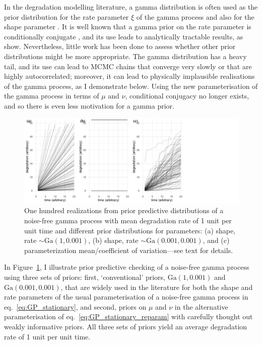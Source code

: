 In the degradation modelling literature, a gamma distribution is often used as the prior distribution for the rate parameter $\xi$ of the gamma process \citep{lawless2004} and also for the shape parameter \citep{rodriguez-picon2018}. It is well known that a gamma prior on the rate parameter is conditionally conjugate \citep{pradhan2011}, and its use leads to analytically tractable results, as \cite{lawless2004} show. Nevertheless, little work has been done to assess whether other prior distributions might be more appropriate. The gamma distribution has a heavy tail, and its use can lead to MCMC chains that converge very slowly or that are highly autocorrelated; moreover, it can lead to physically implausible realisations of the gamma process, as I demonstrate below. Using the new parameterisation of the gamma process in terms of $\mu$ and $\nu$, conditional conjugacy no longer exists, and so there is even less motivation for a gamma prior.

\begin{figure}
  \centering
  \includegraphics[width=1.2\textwidth]{./figures/ch-4/PPCs.pdf}
  \caption{One hundred realizations from prior predictive distributions of a noise-free gamma process with mean degradation rate of 1 unit per unit time and different prior distributions for parameters: (a) shape, rate $\sim \mbox{Ga}(1, 0.001)$, (b) shape, rate $\sim \mbox{Ga}(0.001, 0.001)$, and (c) parameterization mean/coefficient of variation---see text for details.}
  \label{fig:ppc}
\end{figure}

In Figure~\ref{fig:ppc}, I illustrate prior predictive checking of a noise-free gamma process using three sets of priors: first, `conventional' priors, $\mbox{Ga}(1, 0.001)$ and $\mbox{Ga}(0.001, 0.001)$, that are widely used in the literature for both the shape and rate parameters of the usual parameterisation of a noise-free gamma process in eq.~\eqref{eq:GP_stationary}, and second, priors on $\mu$ and $\nu$ in the alternative parameterisation of eq.~\eqref{eq:GP_stationary_reparam} with carefully thought out weakly informative priors. All three sets of priors yield an average degradation rate of 1 unit per unit time. 

